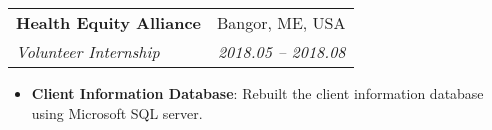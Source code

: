 \documentclass[letterpaper,11pt]{article}
\makeatletter
\newcommand{\resumeItem}[2]{
  \item\small{
    \textbf{#1}{: #2 \vspace{-2pt}}
  }
}
\newcommand{\resumeSubheading}[4]{
  \vspace{-1pt}\item
    \begin{tabular*}{0.97\textwidth}{l@{\extracolsep{\fill}}r}
      \textbf{#1} & #2 \\
      \textit{\small#3} & \textit{\small #4} \\
    \end{tabular*}\vspace{-5pt}
}
\newcommand{\resumeItemListStart}{\begin{itemize}}
\newcommand{\resumeItemListEnd}{\end{itemize}\vspace{-5pt}}
\makeatother
\begin{document}
    
        
            

        
        
	\resumeSubheading
        {Health Equity Alliance}{Bangor, ME, USA}
        {Volunteer Internship}{2018.05 -- 2018.08}
        \resumeItemListStart
        
        \resumeItem{Client Information Database}
            {Rebuilt the client information database using Microsoft SQL server.}
        
        \resumeItemListEnd

\end{document}
